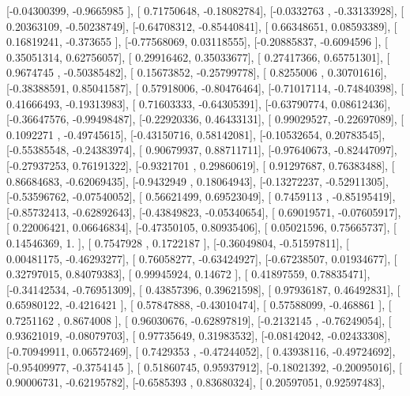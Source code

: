 \documentclass{article}
\begin{document}
       [-0.04300399, -0.9665985 ],
       [ 0.71750648, -0.18082784],
       [-0.0332763 , -0.33133928],
       [ 0.20363109, -0.50238749],
       [-0.64708312, -0.85440841],
       [ 0.66348651,  0.08593389],
       [ 0.16819241, -0.373655  ],
       [-0.77568069,  0.03118555],
       [-0.20885837, -0.6094596 ],
       [ 0.35051314,  0.62756057],
       [ 0.29916462,  0.35033677],
       [ 0.27417366,  0.65751301],
       [ 0.9674745 , -0.50385482],
       [ 0.15673852, -0.25799778],
       [ 0.8255006 ,  0.30701616],
       [-0.38388591,  0.85041587],
       [ 0.57918006, -0.80476464],
       [-0.71017114, -0.74840398],
       [ 0.41666493, -0.19313983],
       [ 0.71603333, -0.64305391],
       [-0.63790774,  0.08612436],
       [-0.36647576, -0.99498487],
       [-0.22920336,  0.46433131],
       [ 0.99029527, -0.22697089],
       [ 0.1092271 , -0.49745615],
       [-0.43150716,  0.58142081],
       [-0.10532654,  0.20783545],
       [-0.55385548, -0.24383974],
       [ 0.90679937,  0.88711711],
       [-0.97640673, -0.82447097],
       [-0.27937253,  0.76191322],
       [-0.9321701 ,  0.29860619],
       [ 0.91297687,  0.76383488],
       [ 0.86684683, -0.62069435],
       [-0.9432949 ,  0.18064943],
       [-0.13272237, -0.52911305],
       [-0.53596762, -0.07540052],
       [ 0.56621499,  0.69523049],
       [ 0.7459113 , -0.85195419],
       [-0.85732413, -0.62892643],
       [-0.43849823, -0.05340654],
       [ 0.69019571, -0.07605917],
       [ 0.22006421,  0.06646834],
       [-0.47350105,  0.80935406],
       [ 0.05021596,  0.75665737],
       [ 0.14546369,  1.        ],
       [ 0.7547928 ,  0.1722187 ],
       [-0.36049804, -0.51597811],
       [ 0.00481175, -0.46293277],
       [ 0.76058277, -0.63424927],
       [-0.67238507,  0.01934677],
       [ 0.32797015,  0.84079383],
       [ 0.99945924,  0.14672   ],
       [ 0.41897559,  0.78835471],
       [-0.34142534, -0.76951309],
       [ 0.43857396,  0.39621598],
       [ 0.97936187,  0.46492831],
       [ 0.65980122, -0.4216421 ],
       [ 0.57847888, -0.43010474],
       [ 0.57588099, -0.468861  ],
       [ 0.7251162 ,  0.8674008 ],
       [ 0.96030676, -0.62897819],
       [-0.2132145 , -0.76249054],
       [ 0.93621019, -0.08079703],
       [ 0.97735649,  0.31983532],
       [-0.08142042, -0.02433308],
       [-0.70949911,  0.06572469],
       [ 0.7429353 , -0.47244052],
       [ 0.43938116, -0.49724692],
       [-0.95409977, -0.3754145 ],
       [ 0.51860745,  0.95937912],
       [-0.18021392, -0.20095016],
       [ 0.90006731, -0.62195782],
       [-0.6585393 ,  0.83680324],
       [ 0.20597051,  0.92597483],
\end{document}
